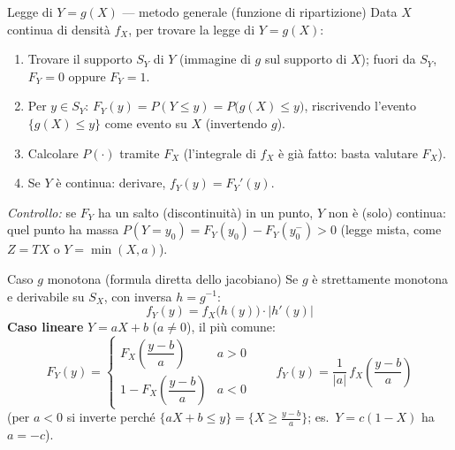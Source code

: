 \documentclass[11pt]{article}
\begin{document}
\begin{concetto}[barSlate]{Legge di $Y=g(X)$ --- metodo generale (funzione di ripartizione)}
Data $X$ continua di densit\`a $f_X$, per trovare la legge di $Y=g(X)$:
\begin{enumerate}[leftmargin=1.3em,itemsep=2pt,topsep=2pt]
\item Trovare il supporto $S_Y$ di $Y$ (immagine di $g$ sul supporto di $X$); fuori da $S_Y$, $F_Y=0$ oppure $F_Y=1$.
\item Per $y\in S_Y$: $F_Y(y)=P(Y\le y)=P\big(g(X)\le y\big)$, riscrivendo l'evento $\{g(X)\le y\}$ come evento su $X$ (invertendo $g$).
\item Calcolare $P(\cdot)$ tramite $F_X$ (l'integrale di $f_X$ \`e gi\`a fatto: basta valutare $F_X$).
\item Se $Y$ \`e continua: derivare, $f_Y(y)=F_Y'(y)$.
\end{enumerate}
\emph{Controllo:} se $F_Y$ ha un salto (discontinuit\`a) in un punto, $Y$ non \`e (solo) continua: quel punto ha massa $P(Y=y_0)=F_Y(y_0)-F_Y(y_0^-)>0$ (legge mista, come $Z=TX$ o $Y=\min(X,a)$).
\end{concetto}

\begin{concetto}[barSlate]{Caso $g$ monotona (formula diretta dello jacobiano)}
Se $g$ \`e strettamente monotona e derivabile su $S_X$, con inversa $h=g^{-1}$:
\[ f_Y(y) = f_X\big(h(y)\big)\cdot \big|h'(y)\big| \]
\textbf{Caso lineare} $Y=aX+b$ ($a\neq0$), il pi\`u comune:
\[ F_Y(y)=\begin{cases} F_X\!\left(\dfrac{y-b}{a}\right) & a>0 \\[4pt] 1-F_X\!\left(\dfrac{y-b}{a}\right) & a<0 \end{cases} \qquad f_Y(y)=\frac{1}{|a|}\,f_X\!\left(\frac{y-b}{a}\right) \]
(per $a<0$ si inverte perch\'e $\{aX+b\le y\}=\{X\ge \frac{y-b}{a}\}$; es.\ $Y=c(1-X)$ ha $a=-c$).
\end{concetto}
\end{document}
